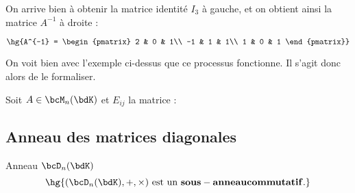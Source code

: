 \documentclass[a4paper,french,bookmarks]{article}
\begin{document}
\begin{example}{}{}
    On arrive bien à obtenir la matrice identité $I_3$ à gauche, et on obtient ainsi la matrice $A^{-1}$ à droite :
    
    \[ \hg{A^{-1} = \begin{pmatrix}
        2 & 0 & 1\\
        -1 & 1 & 1\\
        1 & 0 & 1
    \end{pmatrix}}\]
\end{example}

On voit bien avec l'exemple ci-dessus que ce processus fonctionne. Il s'agit donc alors de le formaliser.

Soit $A \in \bcM_n(\bdK)$ et $E_{ij}$ la matrice :

\begin{center}
\end{center}



\newpage


\subsection{Anneau des matrices diagonales}

\begin{theorem}{Anneau $\bcD_n(\bdK)$}{}
    \[ \hg{(\bcD_n(\bdK), +, \times) \ \text{est un} \ \bf{sous-anneau commutatif}.}\]
\end{theorem}
\end{document}

